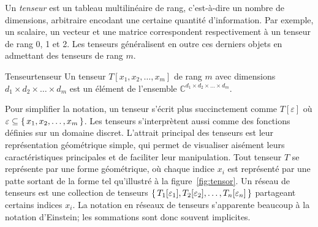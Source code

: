 Un \textit{tenseur} est un tableau multilinéaire de rang, c'est-à-dire un nombre de dimensions, arbitraire encodant une certaine quantité d'information. Par exemple, un scalaire, un vecteur et une matrice correspondent respectivement à un tenseur de rang 0, 1 et 2. Les tenseurs généralisent en outre ces derniers objets en admettant des tenseurs de rang $m$. 

\begin{maindefinition}{Tenseur}{tenseur}
    Un tenseur $T[x_{1}, x_{2}, \dots, x_{m}]$ de rang $m$ avec dimensions $d_{1} \times d_{2} \times \dots \times d_{m}$ est un élément de l'ensemble $\mathbb{C}^{d_{1} \times d_{2} \times \dots \times d_{m}}$.
\end{maindefinition}

Pour simplifier la notation, un tenseur s'écrit plus succinctement comme $T[\varepsilon]$ où $\varepsilon \subseteq \set{ x_{1}, x_{2}, \dots, x_{m} }$. Les tenseurs s'interprètent aussi comme des fonctions définies sur un domaine discret. L'attrait principal des tenseurs est leur représentation géométrique simple, qui permet de visualiser aisément leurs caractéristiques principales et de faciliter leur manipulation. Tout tenseur $T$ se représente par une forme géométrique, où chaque indice $x_{i}$ est représenté par une patte sortant de la forme tel qu'illustré à la figure~\ref{fig:tensor}. Un réseau de tenseurs est une collection de tenseurs $\set{ T_{1}[\varepsilon_{1}], T_{2}[\varepsilon_{2}], \dots, T_{n}[\varepsilon_{n}] }$ partageant certains indices $x_{i}$. La notation en réseaux de tenseurs s'apparente beaucoup à la notation d'Einstein; les sommations sont donc souvent implicites. 

